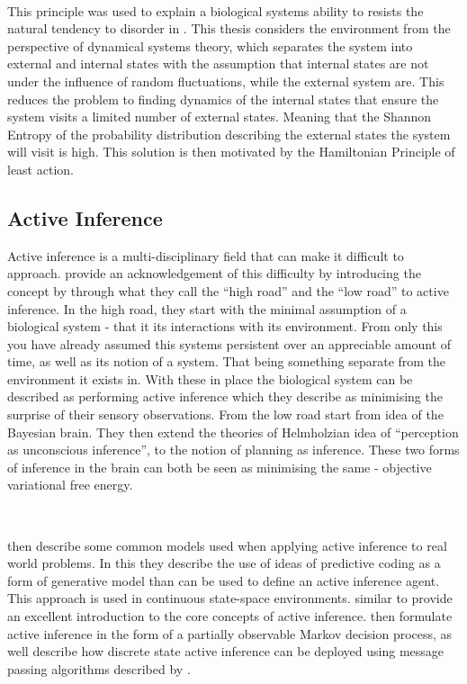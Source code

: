 \documentclass{article}
\begin{document}
\

This principle was used to explain a biological systems ability to resists the natural tendency to disorder in \cite{friston2012free}. This thesis considers the environment from the perspective of dynamical systems theory, which separates the system into external and internal states with the assumption that internal states are not under the influence of random fluctuations, while the external system are. This reduces the problem to finding dynamics  of the internal states that ensure the system visits a limited number of external states. Meaning that the Shannon Entropy of the probability distribution describing the external states the system will visit is high. This solution is then motivated by the Hamiltonian Principle of least action.

\subsection{Active Inference}

Active inference is a multi-disciplinary field that can make it difficult to approach. \citet{parr2022ActiveInference} provide an acknowledgement of this difficulty by introducing the concept by through what they call the ``high road'' and the ``low road'' to active inference. In the high road, they start with the minimal assumption of a biological system - that it its interactions with its environment. From only this you have already assumed this systems persistent over an appreciable amount of time, as well as its notion of a system. That being something separate from the environment it exists in. With these in place the biological system can be described as performing active inference which they describe as minimising the surprise of their sensory observations. From the low road \citet{parr2022ActiveInference} start from idea of the Bayesian brain. They then extend the theories of Helmholzian idea of ``perception as unconscious inference'', to the notion of planning as inference. These two forms of inference in the brain can both be seen as minimising the same - objective variational free energy. 

\

\citet{parr2022ActiveInference} then describe some common models used when applying active inference to real world problems. In this they describe the use of ideas of predictive coding as a form of generative model than can be used to define an active inference agent. This approach is used in continuous state-space environments. \citet{smith2022} similar to \cite{parr2022ActiveInference} provide an excellent introduction to the core concepts of active inference. \citet{parr2022ActiveInference, smith2022} then formulate active inference in the form of a partially observable Markov decision process, as well describe how discrete state active inference can be deployed using message passing algorithms described by \citep{winn2005variational, parr2019neuronal}.
\end{document}
